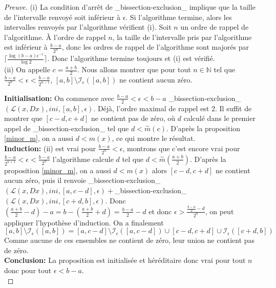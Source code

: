 \documentclass[a4paper,10pt]{article}
\begin{document}
	\begin{proof}[Preuve] 
	
		(i) La condition d'arrêt de \_bissection-exclusion\_ implique que la taille de l'intervalle renvoyé soit inférieur à $\epsilon$. Si l'algorithme termine, alors les intervalles renvoyés par l'algorithme vérifient (i). Soit $n$ un ordre de rappel de l'algorithme. À l'ordre de rappel $n$, la taille de l'intervalle pris par l'algorithme est inférieur à $\frac{b-a}{2^n}$, donc les ordres de rappel de l'algorithme sont majorés par $\lceil \frac{\log (b-a)\epsilon^{-1}}{\log 2}\rceil$. Donc l'algorithme termine toujours et (i) est vérifié.\\
		
		(ii) On appelle $c=\frac{a+b}{2}$. Nous allons montrer que pour tout $n \in \mathbb{N}$ tel que $\frac{b-a}{2^n}<\epsilon<\frac{b-a}{2^{n-1}}$, $[a,b] \setminus \mathcal{I}_{\epsilon}([a,b])$ ne contient aucun zéro.\\
		\vspace{4mm}
		
		\textbf{Initialisation:} On commence avec $\frac{b-a}{2}<\epsilon < b-a$ \_bissection-exclusion\_$(\mathcal{L}(x,Dx),ini,[a,b],\epsilon)$. Déjà, l'ordre maximal de rappel est 2. Il suffit de montrer que $[c-d,c+d]$ ne contient pas de zéro, où $d$ calculé dans le premier appel de \_bissection-exclusion\_ tel que $d<\overset{\sim}{m}(c)$. D'après la proposition \ref{minor_m}, on a aussi $d<m(x)$, ce qui montre le résultat. \\
		\textbf{Induction:} (ii) est vrai pour $\frac{b-a}{2^n}<\epsilon$, montrons que c'est encore vrai pour $\frac{b-a}{2^{n+1}}<\epsilon < \frac{b-a}{2^n}$
		l'algorithme calcule $d$ tel que $d<\overset{\sim}{m}(\frac{a+b}{2})$. D'après la proposition \ref{minor_m}, on a aussi $d<m(x)$ alors $[c-d,c+d]$ ne contient aucun zéro, puis il renvoie 
		\_bissection-exclusion\_$(\mathcal{L}(x,Dx),ini,[a,c-d],\epsilon)+$\_bissection-exclusion\_$(\mathcal{L}(x,Dx),ini,[c+d,b],\epsilon)$.
		Donc $(\frac{a+b}{2}-d)-a=b-(\frac{a+b}{2}+d)=\frac{b-a}{2}-d$ et donc $\epsilon>\frac{\frac{b-a}{2}-d}{2^n}$, on peut appliquer l'hypothèse d'induction.
		On a finalement 
		\[[a,b]\setminus \mathcal{I}_{\epsilon}([a,b])=[a,c-d]\setminus \mathcal{I}_{\epsilon}([a,c-d])\cup [c-d,c+d] \cup \mathcal{I}_\epsilon([c+d,b])\]
		Comme aucune de ces ensembles ne contient de zéro, leur union ne contient pas de zéro.\\
		\noindent\textbf{Conclusion:} La proposition est initialisée et héréditaire donc vrai pour tout $n$ donc pour tout $\epsilon<b-a$.\\
		\vspace{4mm}
		

\end{proof}
\end{document}
